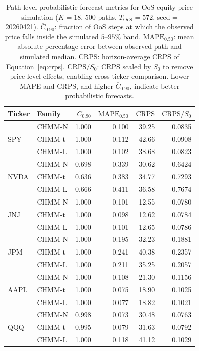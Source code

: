\begin{table}[t]
\centering
\caption{Path-level probabilistic-forecast metrics for OoS equity price simulation ($K = 18$, $500$ paths, $T_{\text{OoS}} = 572$, seed = 20260421). $\overline{C}_{0.90}$: fraction of OoS steps at which the observed price falls inside the simulated $5$--$95\%$ band. $\text{MAPE}_{0.50}$: mean absolute percentage error between observed path and simulated median. $\overline{\text{CRPS}}$: horizon-average CRPS of Equation~\eqref{eq:crps}. $\overline{\text{CRPS}}/S_0$: CRPS scaled by $S_0$ to remove price-level effects, enabling cross-ticker comparison. Lower MAPE and CRPS, and higher $\overline{C}_{0.90}$, indicate better probabilistic forecasts.}
\label{tab:price_sim_path_metrics}
\small
\begin{tabular}{ll r r r r}
\toprule
Ticker & Family & $\overline{C}_{0.90}$ & $\text{MAPE}_{0.50}$ & $\overline{\text{CRPS}}$ & $\overline{\text{CRPS}}/S_0$ \\
\midrule
\multirow{3}{*}{SPY}  & CHMM-N & 1.000 & 0.100 & 39.25 & 0.0835 \\
                      & CHMM-t & 1.000 & 0.112 & 42.66 & 0.0908 \\
                      & CHMM-L & 1.000 & 0.102 & 38.68 & 0.0823 \\
\midrule
\multirow{3}{*}{NVDA} & CHMM-N & 0.698 & 0.339 & 30.62 & 0.6424 \\
                      & CHMM-t & 0.636 & 0.383 & 34.77 & 0.7293 \\
                      & CHMM-L & 0.666 & 0.411 & 36.58 & 0.7674 \\
\midrule
\multirow{3}{*}{JNJ}  & CHMM-N & 1.000 & 0.101 & 12.55 & 0.0780 \\
                      & CHMM-t & 1.000 & 0.098 & 12.62 & 0.0784 \\
                      & CHMM-L & 1.000 & 0.101 & 12.65 & 0.0786 \\
\midrule
\multirow{3}{*}{JPM}  & CHMM-N & 1.000 & 0.195 & 32.23 & 0.1881 \\
                      & CHMM-t & 1.000 & 0.241 & 40.38 & 0.2357 \\
                      & CHMM-L & 1.000 & 0.211 & 35.25 & 0.2057 \\
\midrule
\multirow{3}{*}{AAPL} & CHMM-N & 1.000 & 0.108 & 21.30 & 0.1156 \\
                      & CHMM-t & 1.000 & 0.075 & 18.90 & 0.1025 \\
                      & CHMM-L & 1.000 & 0.077 & 18.82 & 0.1021 \\
\midrule
\multirow{3}{*}{QQQ}  & CHMM-N & 0.998 & 0.073 & 30.48 & 0.0763 \\
                      & CHMM-t & 0.995 & 0.079 & 31.63 & 0.0792 \\
                      & CHMM-L & 1.000 & 0.118 & 41.12 & 0.1029 \\
\bottomrule
\end{tabular}
\end{table}

